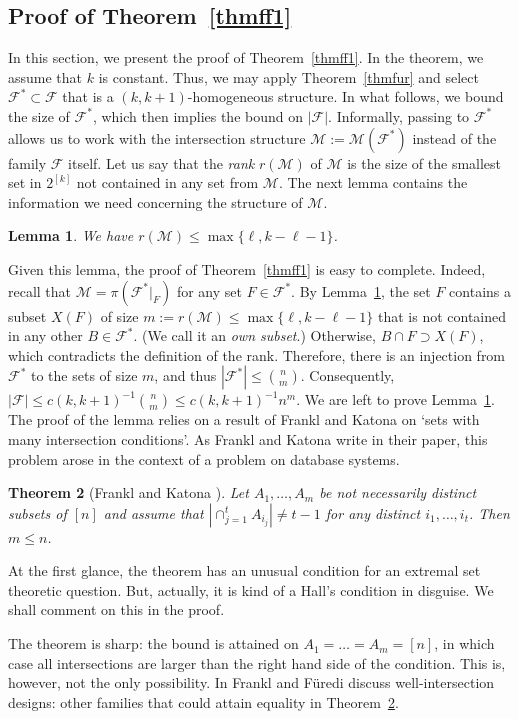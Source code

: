 \documentclass[graybox]{svmult}
\renewcommand{\le}{\leqslant}
\newcommand{\ff}{\mathcal{F}}
\newcommand{\m}{\mathcal}
\newtheorem{thm}{Theorem}
\newtheorem{lem}[thm]{Lemma}
\begin{document}
\subsection{Proof of Theorem~\ref{thmff1}}\label{sec322} In this section, we present the proof of Theorem~\ref{thmff1}. In the theorem, we assume that $k$ is constant. Thus, we may apply Theorem~\ref{thmfur} and select $\ff^*\subset \ff$ that is a $(k,k+1)$-homogeneous structure. In what follows, we bound the size of $\ff^*$, which then implies the bound on $|\ff|$.  Informally, passing to $\ff^*$ allows us to work with the intersection structure $\m M:=\m M(\ff^*)$ instead of the family $\ff$ itself. Let us say that the {\it rank} $r(\m M)$ of $\m M$ is the  size of the smallest set in $2^{[k]}$ not contained in any set from $\m M$. The next lemma contains the information we need concerning the structure of $\m M$.
\begin{lem}\label{lemmanyint}
  We have $r(\m M)\le \max\{\ell,k-\ell-1\}$.
\end{lem}
Given this lemma, the proof of Theorem~\ref{thmff1} is easy to complete. Indeed, recall that $\m M = \pi(\ff^*|_F)$ for any set $F\in \ff^*$. By  Lemma~\ref{lemmanyint}, the set $F$ contains a subset $X(F)$ of size  $m:=r(\m M)\le \max\{\ell,k-\ell-1\}$ that is not contained in any other $B\in \ff^*$. (We call it an {\it own subset}.) Otherwise, $B\cap F\supset X(F)$, which contradicts the definition of the rank. Therefore, there is an injection from $\ff^*$ to the sets of size $m$, and thus $|\ff^*|\le {n\choose m}$. Consequently, $|\ff|\le c(k,k+1)^{-1}  {n\choose m}\le c(k,k+1)^{-1} n^{m}$. We are left to prove Lemma~\ref{lemmanyint}. The proof of the lemma relies on  a result of Frankl and Katona \cite{FrKa} on `sets with many intersection conditions'.  As Frankl and Katona write in their paper, this problem arose in the context of a problem on database systems.

\begin{thm}[Frankl and Katona \cite{FrKa}]\label{thmmanyint}
    Let $A_1,\ldots, A_m$ be not necessarily distinct subsets of $[n]$ and assume that $|\cap_{j=1}^t A_{i_j}|\ne t-1$ for any distinct $i_1,\ldots, i_t$. Then $m\le n$.
\end{thm}
At the first glance, the theorem has an unusual condition for an extremal set theoretic question. But, actually, it is kind of a Hall's condition in disguise. We shall comment on this in the proof.


The theorem is sharp: the bound is attained on $A_1 = \ldots = A_m = [n]$, in which case all intersections are larger than the right hand side of the condition. This is, however, not the only possibility. In \cite{FF1} Frankl and F\"uredi discuss well-intersection designs: other families that could attain equality in Theorem~\ref{thmmanyint}.
\end{document}
